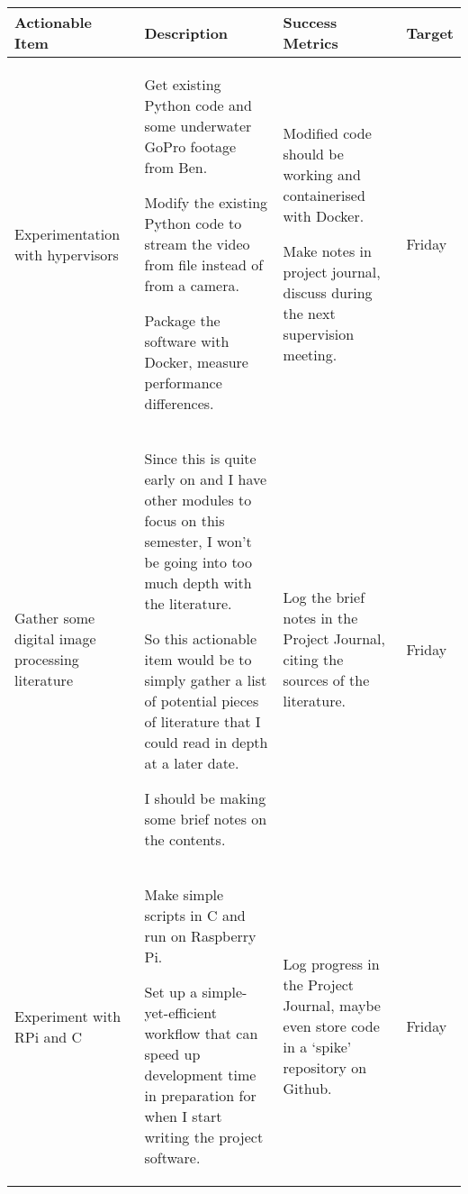 \pagebreak
\begin{table}[!h]
    \centering
    \begin{tabularx}{\textwidth}{|X|X|X|l|}
        \hline
        Actionable Item & Description & Success Metrics & Target \\
        \hline
        \hline
        Experimentation with hypervisors &
        \begin{myitemize}
            \item Get existing Python code and some underwater GoPro footage from Ben.
            \item Modify the existing Python code to stream the video from file instead of from a camera.
            \item Package the software with Docker, measure performance differences.
        \end{myitemize} &
        \begin{myitemize}
            \item Modified code should be working and containerised with Docker.
            \item Make notes in project journal, discuss during the next supervision meeting.
        \end{myitemize} &
        Friday \\
        \hline
        Gather some digital image processing literature &
        \begin{myitemize}
            \item Since this is quite early on and I have other modules to focus on this semester, I won't be going into too much depth with the literature.
            \item So this actionable item would be to simply gather a list of potential pieces of literature that I could read in depth at a later date.
            \item I should be making some brief notes on the contents.
        \end{myitemize} &
        \begin{myitemize}
            \item Log the brief notes in the Project Journal, citing the sources of the literature.
        \end{myitemize} &
        Friday \\
        \hline
        Experiment with RPi and C &
        \begin{myitemize}
            \item Make simple scripts in C and run on Raspberry Pi.
            \item Set up a simple-yet-efficient workflow that can speed up development time in preparation for when I start writing the project software.
        \end{myitemize} &
        \begin{myitemize}
            \item Log progress in the Project Journal, maybe even store code in a `spike' repository on Github.
        \end{myitemize} &
        Friday \\
        \hline
    \end{tabularx}
\end{table}
